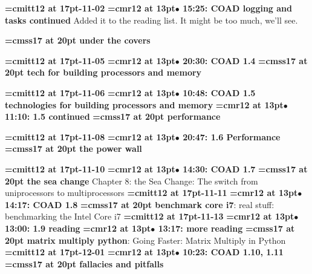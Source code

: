 {\medskip\noindent\bf\font\titlefont=cmitt12 at 17pt-11-02}\medskip
{\smallskip\noindent\bf\font\titlefont=cmr12 at 13pt\titlefont $\bullet$ 15:25: COAD logging and tasks continued}\smallskip
Added it to the reading list. It might be too much, we'll see.
\par

{\medskip\noindent\bf\font\titlefont=cmss17 at 20pt under the covers}\medskip

{\medskip\noindent\bf\font\titlefont=cmitt12 at 17pt-11-05}\medskip
{\smallskip\noindent\bf\font\titlefont=cmr12 at 13pt\titlefont $\bullet$ 20:30: COAD 1.4}\smallskip
{}
{\medskip\noindent\bf\font\titlefont=cmss17 at 20pt tech for building processors and memory}\medskip

{\medskip\noindent\bf\font\titlefont=cmitt12 at 17pt-11-06}\medskip
{\smallskip\noindent\bf\font\titlefont=cmr12 at 13pt\titlefont $\bullet$ 10:48: COAD 1.5 technologies for building processors and memory}\smallskip
{\smallskip\noindent\bf\font\titlefont=cmr12 at 13pt\titlefont $\bullet$ 11:10: 1.5 continued}\smallskip
{}
{\medskip\noindent\bf\font\titlefont=cmss17 at 20pt performance}\medskip

{\medskip\noindent\bf\font\titlefont=cmitt12 at 17pt-11-08}\medskip
{\smallskip\noindent\bf\font\titlefont=cmr12 at 13pt\titlefont $\bullet$ 20:47: 1.6 Performance}\smallskip
{}
{\medskip\noindent\bf\font\titlefont=cmss17 at 20pt the power wall}\medskip

{\medskip\noindent\bf\font\titlefont=cmitt12 at 17pt-11-10}\medskip
{\smallskip\noindent\bf\font\titlefont=cmr12 at 13pt\titlefont $\bullet$ 14:30: COAD 1.7}\smallskip
{}
{\medskip\noindent\bf\font\titlefont=cmss17 at 20pt the sea change}\medskip
Chapter 8: the Sea Change: The switch from uniprocessors
to multiprocessors
{\medskip\noindent\bf\font\titlefont=cmitt12 at 17pt-11-11}\medskip
{\smallskip\noindent\bf\font\titlefont=cmr12 at 13pt\titlefont $\bullet$ 14:17: COAD 1.8}\smallskip
{}
{\medskip\noindent\bf\font\titlefont=cmss17 at 20pt benchmark core i7}: real stuff: benchmarking the Intel Core i7
{\medskip\noindent\bf\font\titlefont=cmitt12 at 17pt-11-13}\medskip
{\smallskip\noindent\bf\font\titlefont=cmr12 at 13pt\titlefont $\bullet$ 13:00: 1.9 reading}\smallskip
{\smallskip\noindent\bf\font\titlefont=cmr12 at 13pt\titlefont $\bullet$ 13:17: more reading}\smallskip
{}
{\medskip\noindent\bf\font\titlefont=cmss17 at 20pt matrix multiply python}: Going Faster: Matrix Multiply in Python
{\medskip\noindent\bf\font\titlefont=cmitt12 at 17pt-12-01}\medskip
{\smallskip\noindent\bf\font\titlefont=cmr12 at 13pt\titlefont $\bullet$ 10:23: COAD 1.10, 1.11}\smallskip
{}
{\medskip\noindent\bf\font\titlefont=cmss17 at 20pt fallacies and pitfalls}\medskip


